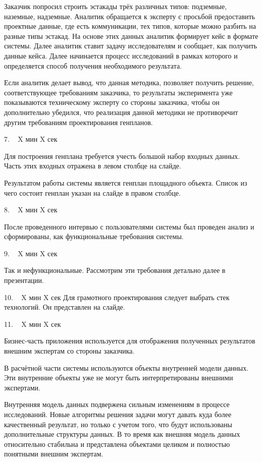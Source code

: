 \documentclass[11pt]{article}
\begin{document}
    Заказчик попросил строить эстакады трёх различных типов: подземные, наземные, надземные.
    Аналитик обращается к эксперту с просьбой предоставить проектные данные, где есть коммуникации,
    тех типов, которые можно разбить на разные типы эстакад.
    На основе этих данных аналитик формирует кейс в формате системы.
    Далее аналитик ставит задачу исследователям и сообщает, как получить данные кейса.
    Далее начинается процесс исследований в рамках которого и определяется способ получения необходимого результата.

    Если аналитик делает вывод, что данная методика, позволяет получить решение, соответствующее требованиям
    заказчика, то результаты эксперимента уже показываются техническому эксперту со стороны заказчика,
    чтобы он дополнительно убедился, что реализация данной методики не противоречит другим требованиям
    проектирования генпланов.

    7. ~ X мин X сек

    Для построения генплана требуется учесть большой набор входных данных.
    Часть этих входных отражена в левом столбце на слайде.

    Результатом работы системы является генплан площадного объекта.
    Список из чего состоит генплан указан на слайде в правом столбце.

    8. ~ X мин X сек

    После проведенного интервью с пользователями системы был проведен анализ и сформированы,
    как функциональные требования системы.

    9. ~ X мин X сек

    Так и нефункциональные.
    Рассмотрим эти требования детально далее в презентации.

    10. ~ X мин X сек
    Для грамотного проектирования следует выбрать стек технологий. Он представлен на слайде.

    11. ~ X мин X сек

    Бизнес-часть приложения используется для отображения полученных результатов внешним экспертам со стороны заказчика.

    В расчётной части системы используются объекты внутренней модели данных.
    Эти внутренние объекты уже не могут быть интерпретированы внешними экспертами.

    Внутренняя модель данных подвержена сильным изменениям в процессе исследований.
    Новые алгоритмы решения задачи могут давать куда более качественный результат, но только с учетом того, что
    будут использованы дополнительные структуры данных. В то время как внешняя модель данных относительно стабильна
    и представлена объектами целиком и полностью понятными внешним экспертам.
\end{document}
